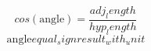 \[cos(\text{{{angle}}})=\frac{{{adj_length}}}{{{hyp_length}}}\]
\[\text{{{angle}}}{equal_sign}{result_with_unit}\]
